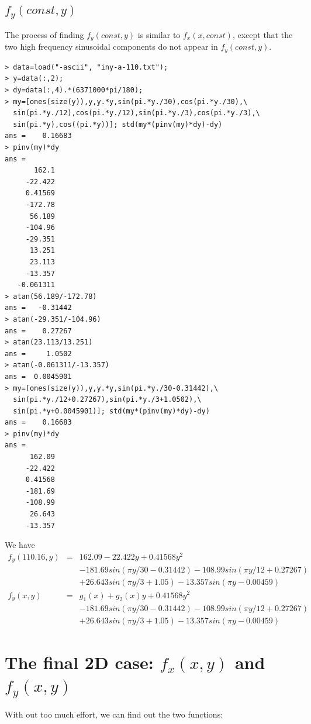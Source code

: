 \documentclass[a4paper]{article}
\begin{document}
\subsection{$f_y(const, y)$}

The process of finding $f_y(const, y)$ is similar to $f_x(x, const)$, except
that the two high frequency sinusoidal components do not appear in $f_y(const,
y)$.
\begin{verbatim}
> data=load("-ascii", "iny-a-110.txt");
> y=data(:,2);
> dy=data(:,4).*(6371000*pi/180);
> my=[ones(size(y)),y,y.*y,sin(pi.*y./30),cos(pi.*y./30),\
  sin(pi.*y./12),cos(pi.*y./12),sin(pi.*y./3),cos(pi.*y./3),\
  sin(pi.*y),cos((pi.*y))]; std(my*(pinv(my)*dy)-dy)
ans =    0.16683
> pinv(my)*dy
ans =
       162.1
     -22.422
     0.41569
     -172.78
      56.189
     -104.96
     -29.351
      13.251
      23.113
     -13.357
   -0.061311
> atan(56.189/-172.78)
ans =   -0.31442
> atan(-29.351/-104.96)
ans =    0.27267
> atan(23.113/13.251)
ans =     1.0502
> atan(-0.061311/-13.357)
ans =  0.0045901
> my=[ones(size(y)),y,y.*y,sin(pi.*y./30-0.31442),\
  sin(pi.*y./12+0.27267),sin(pi.*y./3+1.0502),\
  sin(pi.*y+0.0045901)]; std(my*(pinv(my)*dy)-dy)
ans =    0.16683
> pinv(my)*dy
ans =
      162.09
     -22.422
     0.41568
     -181.69
     -108.99
      26.643
     -13.357
\end{verbatim}

We have
\begin{eqnarray}
f_y(110.16,y) &=& 162.09-22.422y+0.41568y^2 \nonumber \\
              & & -181.69sin(\pi y/30-0.31442)-108.99sin(\pi y/12+0.27267) \nonumber \\
              & & +26.643sin(\pi y/3+1.05)-13.357sin(\pi y-0.00459) \\
f_y(x,y)      &=& g_1(x)+g_2(x)y+0.41568y^2 \nonumber \\
              & & -181.69sin(\pi y/30-0.31442)-108.99sin(\pi y/12+0.27267) \nonumber \\
              & & +26.643sin(\pi y/3+1.05)-13.357sin(\pi y-0.00459)
\end{eqnarray}

\section{The final 2D case: $f_x(x,y)$ and $f_y(x,y)$}
With out too much effort, we can find out the two functions:
\end{document}
